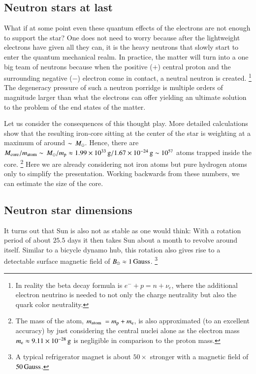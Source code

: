 \subsection{Neutron stars at last}
What if at some point even these quantum effects of the electrons are not enough to support the star?
One does not need to worry because after the lightweight electrons have given all they can, it is the heavy neutrons that slowly start to enter the quantum mechanical realm.
In practice, the matter will turn into a one big team of neutrons because when the positive ($+$) central proton and the surrounding negative ($-$) electron come in contact, a neutral neutron is created.%
\footnote{In reality the beta decay formula is $e^- + p = n + \nu_e$, where the additional electron neutrino is needed to not only the charge neutrality but also the quark color neutrality.}
The degeneracy pressure of such a neutron porridge is multiple orders of magnitude larger than what the electrons can offer yielding an ultimate solution to the problem of the end states of the matter.

Let us consider the consequences of this thought play.
More detailed calculations show that the resulting iron-core sitting at the center of the star is weighting at a maximum of around $\sim \, M_{\odot}$.
Hence, there are $M_{\mathrm{core}} / m_{\mathrm{atom}} \sim \, M_{\odot} / m_{\mathrm{p}} \approx 1.99 \times 10^{33} \, \mathrm{g} / 1.67 \times 10^{-24} \, \mathrm{g} \sim 10^{57}$ atoms trapped inside the core.
\footnote{
    The mass of the atom, $m_{\mathrm{atom}} = \mproton + \me$, is also approximated (to an excellent accuracy) by just considering the central nuclei alone as the electron mass $m_{\mathrm{e}} \approx 9.11 \times 10^{-28} \, \mathrm{g}$ is negligible in comparison to the proton mass.
}
Here we are already considering not iron atoms but pure hydrogen atoms only to simplify the presentation.
Working backwards from these numbers, we can estimate the size of the core.



\subsection{Neutron star dimensions}
It turns out that Sun is also not as stable as one would think:
With a rotation period of about $25.5$ days it then takes Sun about a month to revolve around itself.
Similar to a bicycle dynamo hub, this rotation also gives rise to a detectable surface magnetic field of $B_{\odot} \approx 1 \, \mathrm{Gauss}$.%
\footnote{A typical refrigerator magnet is about $50\times$ stronger with a magnetic field of $50\, \mathrm{Gauss}$.}

